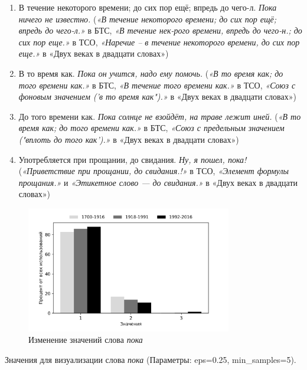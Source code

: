 \documentclass[LI,VKR]{HSEUniversity}
\begin{document}
\begin{enumerate}
    \item В течение некоторого времени; до сих пор ещё; впредь до чего-л. \textit{Пока ничего не известно.}
(\textit{«В течение некоторого времени; до сих пор ещё; впредь до чего-л.»} в БТС,
\textit{«В течение нек-рого времени, впредь до чего-н.; до сих пор еще.»} в ТСО,
\textit{«Наречие – в течение некоторого времени, до сих пор еще.»} в «Двух веках в двадцати словах»)

    \item В то время как. \textit{Пока он учится, надо ему помочь.}
(\textit{«В то время как; до того времени как.»} в БТС,
\textit{«В течение того времени как.»} в ТСО,
\textit{«Союз с фоновым значением (’в то время как").»} в «Двух веках в двадцати словах»)

    \item До того времени как. \textit{Пока солнце не взойдёт, на траве лежит иней.}
(\textit{«В то время как; до того времени как.»} в БТС,
\textit{«Союз с предельным значением ("вплоть до того как’).»} в «Двух веках в двадцати словах»)

    \item Употребляется при прощании, до свидания. \textit{Ну, я пошел, пока!}
(\textit{«Приветствие при прощании, до свидания.!»} в ТСО,
\textit{«Элемент формулы прощания.»} и \textit{«Этикетное слово — до свидания.»} в «Двух веках в двадцати словах»)
\end{enumerate}

\begin{figure}[H]
	\centering
	\includegraphics[width=0.8\textwidth]{img/visualizations/poka_minimal}
	\caption{Изменение значений слова \textit{пока}}
	\label{fig:Пока}
\end{figure}

Значения для визуализации слова \textit{пока} (Параметры: eps=0.25, min\_samples=5).
\end{document}

